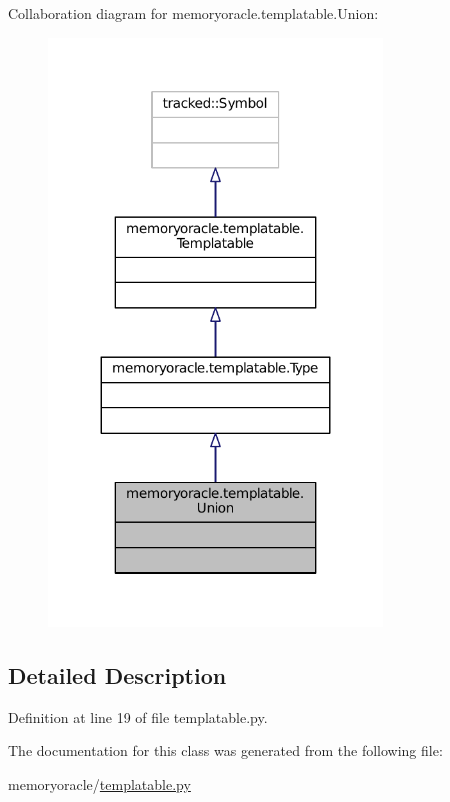 Collaboration diagram for memoryoracle.\+templatable.\+Union\+:\nopagebreak
\begin{figure}[H]
\begin{center}
\leavevmode
\includegraphics[width=251pt]{classmemoryoracle_1_1templatable_1_1Union__coll__graph}
\end{center}
\end{figure}


\subsection{Detailed Description}


Definition at line 19 of file templatable.\+py.



The documentation for this class was generated from the following file\+:\begin{DoxyCompactItemize}
\item 
memoryoracle/\hyperlink{templatable_8py}{templatable.\+py}\end{DoxyCompactItemize}

